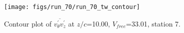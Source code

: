 \begin{figure}[H]
\centering
\texttt{[image: figs/run\_70/run\_70\_tw\_contour]}
\caption{Contour plot of $\overline{v_{\theta}^{\prime} v_{z}^{\prime}}$ at $z/c$=10.00, $V_{free}$=33.01, station 7.}
\label{fig:run_70_tw_contour}
\end{figure}


